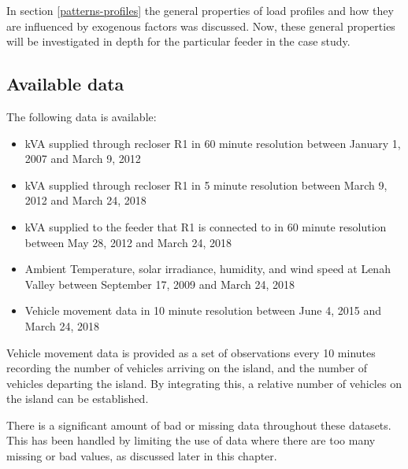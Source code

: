 In section \ref{patterns-profiles} the general properties of load profiles and how they are influenced by exogenous factors was discussed. Now, these general properties will be investigated in depth for the particular feeder in the case study.
\subsection{Available data}
The following data is available:
\begin{itemize}
	\item kVA supplied through recloser R1 in 60 minute resolution between January 1, 2007 and March 9, 2012
	\item kVA supplied through recloser R1 in 5 minute resolution between March 9, 2012 and March 24, 2018
	\item kVA supplied to the feeder that R1 is connected to in 60 minute resolution between May 28, 2012 and March 24, 2018
	\item Ambient Temperature, solar irradiance, humidity, and wind speed at Lenah Valley between September 17, 2009 and March 24, 2018
	\item Vehicle movement data in 10 minute resolution between June 4, 2015 and March 24, 2018
\end{itemize}	
Vehicle movement data is provided as a set of observations every 10 minutes recording the number of vehicles arriving on the island, and the number of vehicles departing the island.
By integrating this, a relative number of vehicles on the island can be established.

There is a significant amount of bad or missing data throughout these datasets.
This has been handled by limiting the use of data where there are too many missing or bad values, as discussed later in this chapter.	


